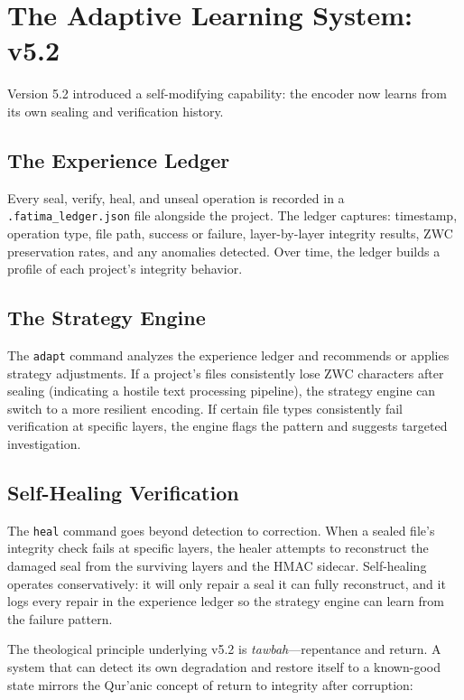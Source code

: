 \documentclass[11pt,a4paper]{article}
\begin{document}
\section{The Adaptive Learning System: v5.2}

Version 5.2 introduced a self-modifying capability: the encoder now learns from its own sealing and verification history.

\subsection{The Experience Ledger}
Every seal, verify, heal, and unseal operation is recorded in a \texttt{.fatima\_ledger.json} file alongside the project. The ledger captures: timestamp, operation type, file path, success or failure, layer-by-layer integrity results, ZWC preservation rates, and any anomalies detected. Over time, the ledger builds a profile of each project's integrity behavior.

\subsection{The Strategy Engine}
The \texttt{adapt} command analyzes the experience ledger and recommends or applies strategy adjustments. If a project's files consistently lose ZWC characters after sealing (indicating a hostile text processing pipeline), the strategy engine can switch to a more resilient encoding. If certain file types consistently fail verification at specific layers, the engine flags the pattern and suggests targeted investigation.

\subsection{Self-Healing Verification}
The \texttt{heal} command goes beyond detection to correction. When a sealed file's integrity check fails at specific layers, the healer attempts to reconstruct the damaged seal from the surviving layers and the HMAC sidecar. Self-healing operates conservatively: it will only repair a seal it can fully reconstruct, and it logs every repair in the experience ledger so the strategy engine can learn from the failure pattern.

The theological principle underlying v5.2 is \textit{tawbah}---repentance and return. A system that can detect its own degradation and restore itself to a known-good state mirrors the Qur'anic concept of return to integrity after corruption:
\end{document}

